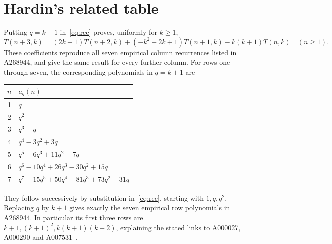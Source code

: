\documentclass[11pt]{article}
\begin{document}
\section{Hardin's related table}
Putting $q=k+1$ in~\eqref{eq:rec} proves, uniformly for $k\geq1$,
\begin{equation}\label{eq:column}
 T(n+3,k)=(2k-1)T(n+2,k)+(-k^2+2k+1)T(n+1,k)
                         -k(k+1)T(n,k)\quad(n\geq1).
\end{equation}
These coefficients reproduce all seven empirical column recurrences
listed in A268944, and give the same result for every further column.
For rows one through seven, the corresponding polynomials in $q=k+1$ are
\begin{center}
\begin{tabular}{cl}
\toprule
$n$ & $a_q(n)$ \\
\midrule
1 & $q$ \\
2 & $q^2$ \\
3 & $q^3-q$ \\
4 & $q^4-3q^2+3q$ \\
5 & $q^5-6q^3+11q^2-7q$ \\
6 & $q^6-10q^4+26q^3-30q^2+15q$ \\
7 & $q^7-15q^5+50q^4-81q^3+73q^2-31q$ \\
\bottomrule
\end{tabular}
\end{center}
They follow successively by substitution in~\eqref{eq:rec}, starting with
$1,q,q^2$. Replacing $q$ by $k+1$ gives exactly the seven empirical row
polynomials in A268944. In particular its first three rows are
$k+1,(k+1)^2,k(k+1)(k+2)$, explaining the stated links to A000027,
A000290 and A007531~\cite{rowrefs}.
\end{document}
